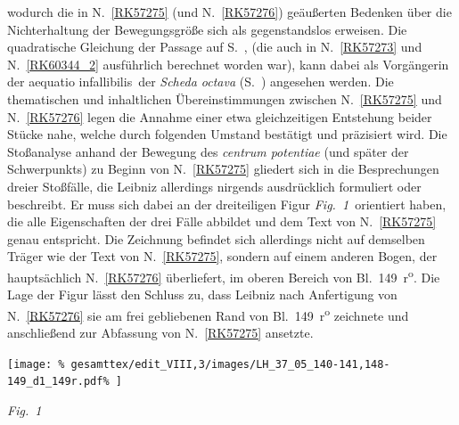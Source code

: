 \begin{ledgroup}
%
wodurch die in N.~\ref{RK57275} (und N.~\ref{RK57276}) geäußerten Bedenken über die Nichterhaltung der Bewegungsgröße sich als gegenstandslos erweisen.
%
Die quadratische Gleichung der Passage auf S.~, 
(die auch in N.~\ref{RK57273} und N.~\ref{RK60344_2} ausführlich berechnet worden war),
%
kann dabei als Vorgängerin der \glqq aequatio infallibilis\grqq\ der \textit{Scheda octava}
(S.~) angesehen werden.
\pend
%
\pstart
Die thematischen und inhaltlichen Übereinstimmungen zwischen N.~\ref{RK57275} und N.~\ref{RK57276} 
legen die Annahme einer etwa gleichzeitigen Entstehung beider Stücke nahe,
%
welche durch folgenden Umstand bestätigt und präzisiert wird.
%
Die Stoßanalyse anhand der Bewegung des \textit{centrum potentiae} (und später der Schwerpunkts) zu Beginn von N.~\ref{RK57275} 
%
gliedert sich in die Besprechungen dreier Stoßfälle, die Leibniz allerdings nirgends ausdrücklich formuliert oder beschreibt.
%
Er muss sich dabei an der dreiteiligen Figur \lbrack\textit{Fig.~1}\rbrack\ orientiert haben, die alle Eigenschaften der drei Fälle
%
abbildet und dem Text von N.~\ref{RK57275} genau entspricht.
%
Die Zeichnung befindet sich allerdings nicht auf demselben Träger wie der Text von N.~\ref{RK57275},
%
sondern auf einem anderen Bogen, der hauptsächlich N.~\ref{RK57276} überliefert, im oberen Bereich von Bl.~149~r\textsuperscript{o}.
%
Die Lage der Figur lässt den Schluss zu, dass Leibniz nach Anfertigung von N.~\ref{RK57276} 
%
sie am frei gebliebenen Rand von Bl.~149~r\textsuperscript{o} zeichnete und anschließend
%
zur Abfassung von N.~\ref{RK57275} ansetzte.
\pend
%
\end{ledgroup}
%
%
\frenchspacing
\vspace{8mm}
\pstart%
\normalsize%
\noindent%
\pend
%
\vspace{1.0em} %
\centerline{%
\texttt{[image: \%
gesamttex/edit\_VIII,3/images/LH\_37\_05\_140-141,148-149\_d1\_149r.pdf\%
]}} 
\vspace{0.5em}
\centerline{%
\lbrack\textit{Fig.~1}\rbrack}
